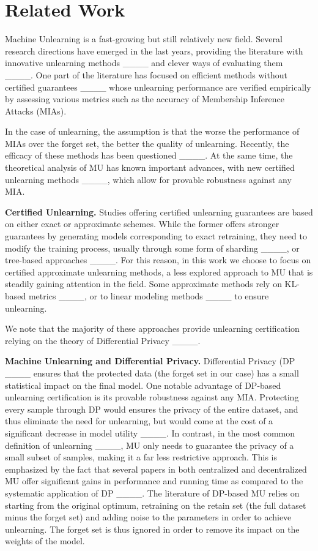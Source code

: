 \section{Related Work}
Machine Unlearning is a fast-growing but still relatively new field. Several research directions have emerged in the last years, providing the literature with innovative unlearning methods ____ %
and clever ways of evaluating them ____. 
One part of the literature has focused on efficient methods without certified guarantees  ____ %
whose unlearning performance are verified empirically by assessing various metrics such as the accuracy of Membership Inference Attacks (MIAs).

In the case of unlearning, the assumption is that the worse the performance of MIAs over the forget set, the better the quality of unlearning. Recently, the efficacy of these methods has been questioned ____.
At the same time, the theoretical analysis of MU has known important advances, with new certified unlearning methods ____, which allow for provable robustness against any MIA. 

\textbf{Certified Unlearning.}
Studies offering certified unlearning guarantees are based on either exact or approximate schemes. While the former offers stronger guarantees by generating models corresponding to exact retraining, they need to modify the training process, usually through some form of sharding ____, or tree-based approaches ____.
For this reason, in this work we choose to focus on certified approximate unlearning methods,
a less explored approach to MU that is steadily gaining attention in the field. Some approximate methods rely on KL-based metrics ____, or  to linear modeling methods ____ to ensure unlearning.

We note that the majority of these approaches provide unlearning certification relying on the theory of Differential Privacy ____.

\textbf{Machine Unlearning and Differential Privacy.}
 Differential Privacy (DP ____ ensures that the protected data (the forget set in our case) has a small statistical impact on the final model. One notable advantage of DP-based unlearning certification is its provable robustness against any MIA. 
 Protecting every sample through DP would ensures the privacy of the entire dataset, and thus eliminate the need for unlearning, but would come at the cost of a significant decrease in model utility ____. In contrast, in the most common definition of unlearning ____, MU only needs to guarantee the privacy of a small subset of samples, making it a far less restrictive approach. This is emphasized by the fact that several papers in both centralized and decentralized MU offer significant gains in performance and running time as compared to the systematic application of DP ____. The literature of DP-based MU relies on starting from the original optimum, retraining on the retain set (the full dataset minus the forget set) and adding noise to the parameters in order to achieve unlearning. The forget set is thus ignored in order to remove its impact on the weights of the model.

